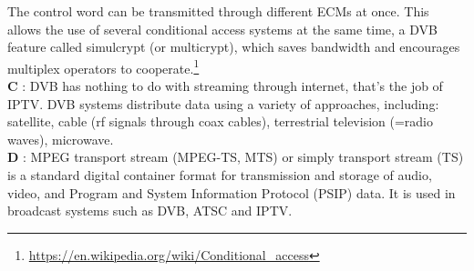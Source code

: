 \documentclass[en]{sourcefiles/eplexam}
\begin{document}
\begin{solution}
\noindent The control word can be transmitted through different ECMs at once. This allows the use of several conditional access systems at the same time, a DVB feature called simulcrypt (or multicrypt), which saves bandwidth and encourages multiplex operators to cooperate.\footnote{\url{https://en.wikipedia.org/wiki/Conditional_access}}\\





\noindent \textbf{C} : DVB has nothing to do with streaming through internet, that's the job of IPTV. DVB systems distribute data using a variety of approaches, including: satellite, cable (rf signals through coax cables), terrestrial television (=radio waves), microwave.\\


\noindent \textbf{D} : MPEG transport stream (MPEG-TS, MTS) or simply transport stream (TS) is a standard digital container format for transmission and storage of audio, video, and Program and System Information Protocol (PSIP) data. It is used in broadcast systems such as DVB, ATSC and IPTV.
\end{solution}
\end{document}
